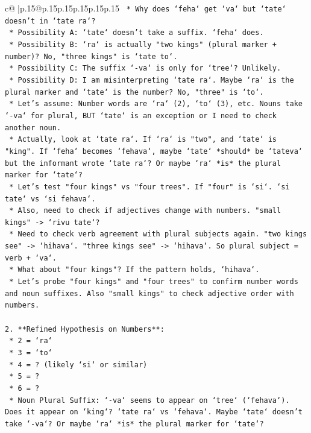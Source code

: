 \documentclass{article}
\begin{document}
{\begin{supertabular}{c@{$\;$}|p{.15\linewidth}@{}p{.15\linewidth}p{.15\linewidth}p{.15\linewidth}p{.15\linewidth}p{.15\linewidth}}
{{{\texttt{        *   Why does `feha` get `va` but `tate` doesn't in `tate ra`?} \\
\texttt{        *   Possibility A: `tate` doesn't take a suffix. `feha` does.} \\
\texttt{        *   Possibility B: `ra` is actually "two kings" (plural marker + number)? No, "three kings" is `tate to`.} \\
\texttt{        *   Possibility C: The suffix `{-}va` is only for `tree`? Unlikely.} \\
\texttt{        *   Possibility D: I am misinterpreting `tate ra`. Maybe `ra` is the plural marker and `tate` is the number? No, "three" is `to`.} \\
\texttt{        *   Let's assume: Number words are `ra` (2), `to` (3), etc. Nouns take `{-}va` for plural, BUT `tate` is an exception or I need to check another noun.} \\
\texttt{        *   Actually, look at `tate ra`. If `ra` is "two", and `tate` is "king". If `feha` becomes `fehava`, maybe `tate` *should* be `tateva` but the informant wrote `tate ra`? Or maybe `ra` *is* the plural marker for `tate`?} \\
\texttt{        *   Let's test "four kings" vs "four trees". If "four" is `si`. `si tate` vs `si fehava`.} \\
\texttt{        *   Also, need to check if adjectives change with numbers. "small kings" {-}> `rivu tate`?} \\
\texttt{        *   Need to check verb agreement with plural subjects again. "two kings see" {-}> `hihava`. "three kings see" {-}> `hihava`. So plural subject = verb + `va`.} \\
\texttt{        *   What about "four kings"? If the pattern holds, `hihava`.} \\
\texttt{        *   Let's probe "four kings" and "four trees" to confirm number words and noun suffixes. Also "small kings" to check adjective order with numbers.} \\
\\ 
\texttt{2.  **Refined Hypothesis on Numbers**:} \\
\texttt{    *   2 = `ra`} \\
\texttt{    *   3 = `to`} \\
\texttt{    *   4 = ? (likely `si` or similar)} \\
\texttt{    *   5 = ?} \\
\texttt{    *   6 = ?} \\
\texttt{    *   Noun Plural Suffix: `{-}va` seems to appear on `tree` (`fehava`). Does it appear on `king`? `tate ra` vs `fehava`. Maybe `tate` doesn't take `{-}va`? Or maybe `ra` *is* the plural marker for `tate`?} \\
}}}
\end{supertabular}}
\end{document}
